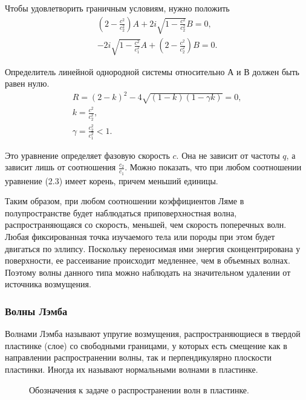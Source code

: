 Чтобы удовлетворить граничным условиям, нужно положить
\begin{eqnarray}
(2-\frac{c^2}{c_2^2})A + 2i\sqrt{1-\frac{c^2}{c_2^2}}B = 0, \\
-2i\sqrt{1-\frac{c^2}{c_1^2}}A + (2-\frac{c^2}{c_2^2})B = 0.
\end{eqnarray}

Определитель линейной однородной системы относительно А и В должен быть равен нулю.
\begin{eqnarray}
R = (2-k)^2 - 4\sqrt{(1-k)(1-\gamma k)} = 0, \\
k = \frac{c^2}{c_2^2}, \\
\gamma = \frac{c_2^2}{c_1^2} < 1.
\end{eqnarray}

Это уравнение определяет фазовую скорость $c$. Она не зависит от частоты $q$, а зависит лишь от соотношения $\frac{c_2}{c_1}$. Можно показать, что при любом соотношении уравнение (2.3) имеет корень, причем меньший единицы.

Таким образом, при любом соотношении коэффициентов Ляме в полупространстве будет наблюдаться приповерхностная волна, распространяющаяся со скорость, меньшей, чем скорость поперечных волн. Любая фиксированная точка изучаемого тела или породы при этом будет двигаться по эллипсу. Поскольку переносимая ими энергия сконцентрирована у поверхности, ее рассеивание происходит медленнее, чем в объемных волнах. Поэтому волны данного типа можно наблюдать на значительном удалении от источника возмущения.


\subsubsection{Волны Лэмба}

Волнами Лэмба называют упругие возмущения, распространяющиеся в твердой пластинке (слое) со свободными границами, у которых есть смещение как в направлении распространении волны, так и перпендикулярно плоскости пластинки. Иногда их называют нормальными волнами в пластинке.

\begin{figure}[h]
\caption{Обозначения к задаче о распространении волн в пластинке.}
\end{figure}

